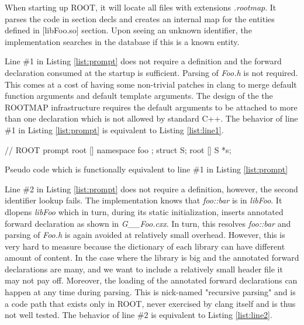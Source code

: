\documentclass{webofc}
\begin{document}
When starting up ROOT, it will locate all files with extensions {\it *.rootmap}. It
parses the code in section {decls} and creates an internal map for the entities
defined in [libFoo.so] section. Upon seeing an unknown identifier, the
implementation searches in the database if this is a known entity.

Line \#1 in Listing \ref{list:prompt} does not require a definition and the forward declaration consumed at the startup is sufficient. Parsing of {\it Foo.h} is not required. This comes at a cost of having some non-trivial patches in clang to merge default function arguments and default template arguments. The design of the the ROOTMAP infrastructure requires the default arguments to be attached to more than one declaration which is not allowed by standard C++. The behavior of line \#1 in Listing \ref{list:prompt} is equivalent to Listing \ref{list:line1}.

\begin{listing}[h]
    \noindent
    \begin{minipage}[h]{.7\textwidth}
    \begin{cppcode*}{}
    // ROOT prompt
    root [] namespace foo { }; struct S;
    root [] S *s;
    \end{cppcode*}
    \end{minipage}
    \caption{Pseudo code which is functionally equivalent to line \#1 in Listing \ref{list:prompt}}
    \label{list:line1}
\end{listing}

Line \#2 in Listing \ref{list:prompt} does not require a definition, however, the second identifier lookup fails. The implementation knows that {\it foo::bar} is in {\it libFoo}. It dlopens {\it libFoo} which in turn, during its static initialization, inserts annotated forward declaration as shown in {\it G\_\_Foo.cxx}. In turn, this resolves {\it foo::bar} and parsing of {\it Foo.h} is again avoided at relatively small overhead. However, this is very hard to measure because the dictionary of each library can have different amount of content. In the case where the library is big and the annotated forward declarations are many, and we want to include a relatively small header file it may not pay off. Moreover, the loading of the annotated forward declarations can happen at any time during parsing. This is nick-named "recursive parsing" and is a code path that exists only in ROOT, never exercised by clang itself and is thus not well tested. The behavior of line \#2 is equivalent to Listing \ref{list:line2}.
\end{document}
